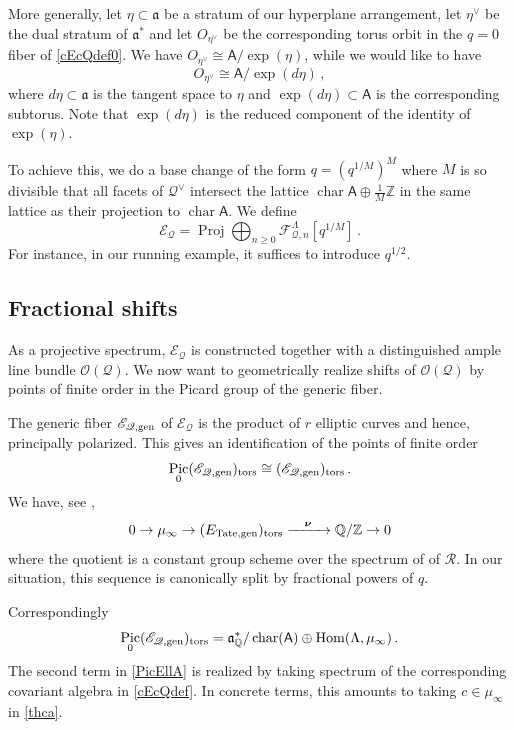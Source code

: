 \documentclass[14pt]{extarticle}
\newcommand{\Q}{\mathbb{Q}}
\newcommand{\Z}{\mathbb{Z}}
\newcommand{\bA}{\mathsf{A}}
\newcommand{\cR}{\mathscr{R}}
\newcommand{\cQ}{\mathscr{Q}}
\newcommand{\cF}{\mathscr{F}}
\newcommand{\cE}{\mathscr{E}}
\newcommand{\cO}{\mathscr{O}}
\newcommand{\fa}{\mathfrak{a}}
\newcommand{\bnu}{\boldsymbol \nu}
\newcommand{\tor}{\textup{tors}}
\newcommand{\gen}{\textup{gen}}
\DeclareMathOperator{\Hom}{Hom}
\DeclareMathOperator{\chr}{char}
\DeclareMathOperator{\cha}{char}
\DeclareMathOperator{\Pic}{Pic}
\DeclareMathOperator{\Proj}{Proj}
\theoremstyle{definition}
\begin{document}
More generally, let $\eta  \subset \fa$ be a stratum of our hyperplane
arrangement, let $\eta^\vee$ be the dual stratum of $\fa^*$
and let $O_{\eta^\vee}$ be the corresponding torus orbit in the
$q=0$ fiber of \eqref{cEcQdef0}. We have $O_{\eta^\vee} \cong \bA
/\exp(\eta)$, while we would like to have 
%
\begin{equation}
  \label{eq:6}
  O_{\eta^\vee} \cong \bA/ \exp(d \eta)\,,  
\end{equation}
%
where $d\eta \subset \fa$ is the tangent space to $\eta$ and
$\exp(d \eta) \subset \bA$ is the corresponding subtorus. Note that
$\exp(d \eta)$ 
is the reduced component of
the identity of $\exp(\eta)$. 

To achieve this, we do a base change of the form $q=(q^{1/M})^M$
where $M$ is so divisible that all facets of $\cQ^\vee$ intersect the
lattice $\chr \bA \oplus \frac1M \Z$ in the same lattice as their
projection to $\chr \bA$. We define
%
\begin{equation}
\cE_{\cQ} = \Proj \bigoplus_{n \ge 0} \cF_{\cQ,n}^{\Lambda}[q^{1/M}] 
\,.\label{cEcQdef}
\end{equation}
%
For instance, in our running example,
it suffices to introduce $q^{1/2}$. 



\subsection{Fractional shifts}\label{s_fraction}

As a projective spectrum, $\cE_\cQ$ is constructed together with a
distinguished ample line bundle $\cO(\cQ)$. We now want to
geometrically realize shifts of $\cO(\cQ)$ by points of finite order
in the Picard group of the generic fiber. 

The generic fiber $\cE_{\cQ,\gen}$ of $\cE_{\cQ}$ is the product of $r$ elliptic curves
and hence, principally polarized. This 
gives an identification of the points of
finite order
$$
\Pic_0 (\cE_{\cQ,\gen})_\tor \cong (\cE_{\cQ,\gen})_\tor \,. 
$$
We have, see \cite{Tate}, 
$$
0 \to \mu_\infty \to (E_{\textup{Tate},\gen})_\tor  \xrightarrow{\quad \bnu
  \quad}  \Q/\Z \to 0 
$$
where the quotient is a constant group scheme over the spectrum of of
$\cR$. In our situation, this sequence is canonically split by
fractional powers of $q$. 


Correspondingly
%
\begin{equation}
\Pic_0 (\cE_{\cQ,\gen})_\tor  = \fa^*_\Q/ \cha(\bA) \oplus
\Hom(\Lambda, \mu_\infty) \,.\label{PicEllA}
\end{equation}
%
The second term in \eqref{PicEllA} is realized by taking spectrum of
the corresponding covariant algebra in \eqref{cEcQdef}. In concrete
terms, this amounts to taking $c\in \mu_\infty$ in \eqref{thca}.
\end{document}
